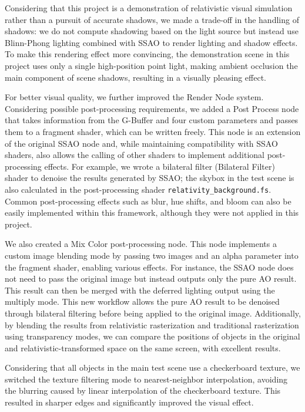 \documentclass{article}
\begin{document}
Considering that this project is a demonstration of relativistic visual simulation rather than a pursuit of accurate shadows, we made a trade-off in the handling of shadows: we do not compute shadowing based on the light source but instead use Blinn-Phong lighting combined with SSAO to render lighting and shadow effects. To make this rendering effect more convincing, the demonstration scene in this project uses only a single high-position point light, making ambient occlusion the main component of scene shadows, resulting in a visually pleasing effect.

For better visual quality, we further improved the Render Node system. Considering possible post-processing requirements, we added a Post Process node that takes information from the G-Buffer and four custom parameters and passes them to a fragment shader, which can be written freely. This node is an extension of the original SSAO node and, while maintaining compatibility with SSAO shaders, also allows the calling of other shaders to implement additional post-processing effects. For example, we wrote a bilateral filter (Bilateral Filter) shader to denoise the results generated by SSAO; the skybox in the test scene is also calculated in the post-processing shader \lstinline|relativity_background.fs|. Common post-processing effects such as blur, hue shifts, and bloom can also be easily implemented within this framework, although they were not applied in this project.

We also created a Mix Color post-processing node. This node implements a custom image blending mode by passing two images and an alpha parameter into the fragment shader, enabling various effects. For instance, the SSAO node does not need to pass the original image but instead outputs only the pure AO result. This result can then be merged with the deferred lighting output using the multiply mode. This new workflow allows the pure AO result to be denoised through bilateral filtering before being applied to the original image. Additionally, by blending the results from relativistic rasterization and traditional rasterization using transparency modes, we can compare the positions of objects in the original and relativistic-transformed space on the same screen, with excellent results.

Considering that all objects in the main test scene use a checkerboard texture, we switched the texture filtering mode to nearest-neighbor interpolation, avoiding the blurring caused by linear interpolation of the checkerboard texture. This resulted in sharper edges and significantly improved the visual effect.
\end{document}
